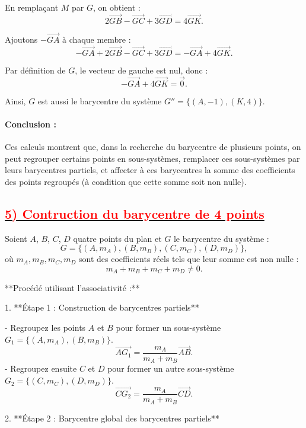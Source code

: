 \documentclass{article}
\begin{document}
En remplaçant \( M \) par \( G \), on obtient :  
\[
2\overrightarrow{GB} - \overrightarrow{GC} + 3\overrightarrow{GD} = 4\overrightarrow{GK}.
\]

Ajoutons \( -\overrightarrow{GA} \) à chaque membre :  
\[
-\overrightarrow{GA} + 2\overrightarrow{GB} - \overrightarrow{GC} + 3\overrightarrow{GD} = -\overrightarrow{GA} + 4\overrightarrow{GK}.
\]

Par définition de \( G \), le vecteur de gauche est nul, donc :  
\[
-\overrightarrow{GA} + 4\overrightarrow{GK} = \vec{0}.
\]

Ainsi, \( G \) est aussi le barycentre du système \( G'' = \{(A, -1), (K, 4)\} \).

\paragraph{Conclusion :}  
Ces calculs montrent que, dans la recherche du barycentre de plusieurs points, on peut regrouper certains points en sous-systèmes, remplacer ces sous-systèmes par leurs barycentres partiels, et affecter à ces barycentres la somme des coefficients des points regroupés (à condition que cette somme soit non nulle).

		
\subsection*{\underline{\textbf{\textcolor{red}{5) Contruction du barycentre de 4 points}}}}

Soient \( A \), \( B \), \( C \), \( D \) quatre points du plan et \( G \) le barycentre du système :  
\[
G = \{(A, m_A), (B, m_B), (C, m_C), (D, m_D)\},
\]
où \( m_A, m_B, m_C, m_D \) sont des coefficients réels tels que leur somme est non nulle :  
\[
m_A + m_B + m_C + m_D \neq 0.
\]

**Procédé utilisant l’associativité :**

1. **Étape 1 : Construction de barycentres partiels**
  
   - Regroupez les points \( A \) et \( B \) pour former un sous-système \( G_1 = \{(A, m_A), (B, m_B)\} \).  
     \[
     \overrightarrow{AG_{1}} = \frac{m_A}{{m_A + m_B}} \overrightarrow{AB}.
     \]
   - Regroupez ensuite \( C \) et \( D \) pour former un autre sous-système \( G_2 = \{(C, m_C), (D, m_D)\} \).  
     \[
     \overrightarrow{CG_{2}} = \frac{m_A}{{m_A + m_B}} \overrightarrow{CD}.
     \]

2. **Étape 2 : Barycentre global des barycentres partiels**  
\end{document}
